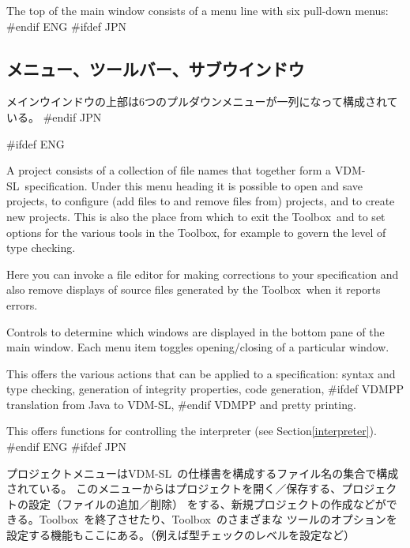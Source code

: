 \documentclass[\pformat,12pt]{article}
\newcommand{\vdmslpp}{VDM-SL}
\newcommand{\Toolbox}{Toolbox}
\newcommand{\vdmslpp}{VDM++}
\newcommand{\Toolbox}{Toolbox}
\newcommand{\guicmd}[1]{{\sf #1}}
\newcommand{\guicmd}[1]{{\gt #1}}
\begin{document}
The top of the main window consists of a menu line with six pull-down
menus:
#endif ENG
#ifdef JPN
\subsection{メニュー、ツールバー、サブウインドウ}

メインウインドウの上部は6つのプルダウンメニューが一列になって構成されている。
#endif JPN

\begin{description}
#ifdef ENG
\item[\guicmd{Project}:] A project consists of a
  collection of file  
  names that together form a \vdmslpp\ specification. Under this menu
  heading it is possible to open and save projects, to configure (add
  files to and remove files from) projects, and to create new
  projects. This is also the place from which to exit the \Toolbox\
  and to set options for the various tools in the \Toolbox, for
  example to govern the level of type checking.

\item[\guicmd{File}:] Here you can invoke a file editor for making
  corrections to your specification and also remove displays of source
  files generated by the \Toolbox\ when it reports errors.

\item[\guicmd{Windows}:] Controls to determine which windows are
  displayed in the bottom pane of the main window. Each menu item
  toggles opening/closing of a particular window.

\item[\guicmd{Actions}:] This offers the various
  actions that can be applied to a specification: syntax and type
  checking, generation of integrity properties, code generation, 
#ifdef VDMPP 
translation from Java to \vdmslpp, 
#endif VDMPP 
and pretty printing.

\item[\guicmd{Interpreter}:] This offers
  functions for controlling the interpreter (see
  Section\ref{interpreter}).
#endif ENG
#ifdef JPN
\item[\guicmd{プロジェクト}:]
  プロジェクトメニューは\vdmslpp\ の仕様書を構成するファイル名の集合で構成されている。
  このメニューからはプロジェクトを開く／保存する、プロジェクトの設定（ファイルの追加／削除）
  をする、新規プロジェクトの作成などができる。\Toolbox\ を終了させたり、\Toolbox\ のさまざまな
  ツールのオプションを設定する機能もここにある。（例えば型チェックのレベルを設定など）


\end{description}
\end{document}
